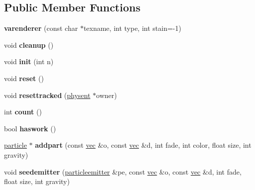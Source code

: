\subsection*{Public Member Functions}
\begin{DoxyCompactItemize}
\item 
\mbox{\label{structvarenderer_a228df59a9ee09cd3d9922ed37369993b}} 
{\bfseries varenderer} (const char $\ast$texname, int type, int stain=-\/1)
\item 
\mbox{\label{structvarenderer_a7d67f897e9448c73921485c13eef4a9c}} 
void {\bfseries cleanup} ()
\item 
\mbox{\label{structvarenderer_a3ba6d5593e241a8fb5d68f20227f5bfc}} 
void {\bfseries init} (int n)
\item 
\mbox{\label{structvarenderer_ae41e6ae1abff5067e82fa0d40d04c462}} 
void {\bfseries reset} ()
\item 
\mbox{\label{structvarenderer_ac9b11173c5a8c1f37f0411bd4c28938b}} 
void {\bfseries resettracked} (\hyperlink{structphysent}{physent} $\ast$owner)
\item 
\mbox{\label{structvarenderer_aad8bddcb021a0d06d43e0b11c1b085fd}} 
int {\bfseries count} ()
\item 
\mbox{\label{structvarenderer_a3752cf8fa284ac1ae1765d854cbb4ea3}} 
bool {\bfseries haswork} ()
\item 
\mbox{\label{structvarenderer_adaed86fceedbff5b00bc412fbe855ee0}} 
\hyperlink{structparticle}{particle} $\ast$ {\bfseries addpart} (const \hyperlink{structvec}{vec} \&o, const \hyperlink{structvec}{vec} \&d, int fade, int color, float size, int gravity)
\item 
\mbox{\label{structvarenderer_adec28592a450c2d267f614172b85beff}} 
void {\bfseries seedemitter} (\hyperlink{structparticleemitter}{particleemitter} \&pe, const \hyperlink{structvec}{vec} \&o, const \hyperlink{structvec}{vec} \&d, int fade, float size, int gravity)
\item 
\mbox{\label{structvarenderer_aa4774979433cb5c347dd3351146e46de}} 

\end{DoxyCompactItemize}
